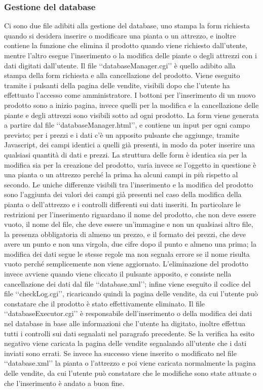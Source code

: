 {{		\subsubsection{Gestione del database}
			Ci sono due file adibiti alla gestione del database, uno stampa la form richiesta quando si desidera inserire o modificare una pianta o un attrezzo, e inoltre contiene la funzione che elimina il prodotto quando viene richiesto dall'utente, mentre l'altro esegue l'inserimento o la modifica delle piante o degli attrezzi con i dati digitati dall'utente.
			Il file ‘‘databaseManager.cgi’’ è quello adibito alla stampa della form richiesta e alla cancellazione del prodotto. Viene eseguito tramite i pulsanti della pagina delle vendite, visibili dopo che l'utente ha effettuato l'accesso come amministratore. I bottoni per l'inserimento di un nuovo prodotto sono a inizio pagina, invece quelli per la modifica e la cancellazione delle piante e degli attrezzi sono visibili sotto ad ogni prodotto. La form viene generata a partire dal file ‘‘databaseManager.html’’, e contiene un input per ogni campo previsto; per i prezzi e i dati c'è un apposito pulsante che aggiunge, tramite Javascript, dei campi identici a quelli già presenti, in modo da poter inserire una qualsiasi quantità di dati e prezzi. La struttura delle form è identica sia per la modifica sia per la creazione del prodotto, varia invece se l'oggetto in questione è una pianta o un attrezzo perché la prima ha alcuni campi in più rispetto al secondo. Le uniche differenze visibili tra l'inserimento e la modifica del prodotto sono l'aggiunta dei valori dei campi già presenti nel caso della modifica della pianta o dell'attrezzo e i controlli differenti sui dati inseriti. In particolare le restrizioni per l'inserimento riguardano il nome del prodotto, che non deve essere vuoto, il nome del file, che deve essere un'immagine e non un qualsiasi altro file, la presenza obbligatoria di almeno un prezzo, e il formato dei prezzi, che deve avere un punto e non una virgola, due cifre dopo il punto e almeno una prima; la modifica dei dati segue le stesse regole ma non segnala errore se il nome risulta vuoto perché semplicemente non viene aggiornato. L'eliminazione del prodotto invece avviene quando viene cliccato il pulsante apposito, e consiste nella cancellazione dei dati dal file ‘‘database.xml’’; infine viene eseguito il codice del file ‘‘checkLog.cgi’’, ricaricando quindi la pagina delle vendite, da cui l'utente può constatare che il prodotto è stato effettivamente eliminato.
			Il file ‘‘databaseExecutor.cgi’’ è responsabile dell'inserimento o della modifica dei dati nel database in base alle informazioni che l'utente ha digitato, inoltre effettua tutti i controlli sui dati segnalati nel paragrafo precedente. Se la verifica ha esito negativo viene caricata la pagina delle vendite segnalando all'utente che i dati inviati sono errati. Se invece ha successo viene inserito o modificato nel file ‘‘database.xml’’ la pianta o l'attrezzo e poi viene caricata normalmente la pagina delle vendite, da cui l'utente può constatare che le modifiche sono state attuate o che l'inserimento è andato a buon fine.
	}
}